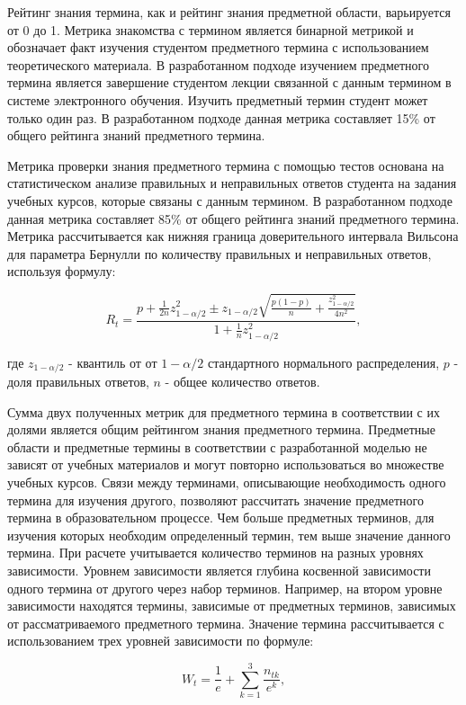 Рейтинг знания термина, как и рейтинг знания предметной области, варьируется от 0 до 1. Метрика знакомства с термином является бинарной метрикой и обозначает факт изучения студентом предметного термина с использованием теоретического материала. В разработанном подходе изучением предметного термина является завершение студентом лекции связанной с данным термином в системе электронного обучения. Изучить предметный термин студент может только один раз. В разработанном подходе данная метрика составляет 15\% от общего рейтинга знаний предметного термина.

Метрика проверки знания предметного термина с помощью тестов основана на статистическом анализе правильных и неправильных ответов студента на задания учебных курсов, которые связаны с данным термином. В разработанном подходе данная метрика составляет 85\% от общего рейтинга знаний предметного термина. Метрика рассчитывается как нижняя граница доверительного интервала Вильсона для параметра Бернулли по количеству правильных и неправильных ответов, используя формулу:

$$
    R_t = \frac{p+\frac{1}{2n}z_{1-\alpha/2}^2 \pm z_{1-\alpha/2}\sqrt{\frac{p(1-p)}{n}+\frac{z_{1-\alpha/2}^2}{4n^2}}{} }{1+\frac{1}{n}z_{1-\alpha/2}^2},
$$

где \(z_{1-\alpha/2}\) - квантиль от от \(1-\alpha/2\) стандартного нормального распределения, \(p\) - доля правильных ответов, \(n\) - общее количество ответов. 

Сумма двух полученных метрик для предметного термина в соответствии с их долями является общим рейтингом знания предметного термина. Предметные области и предметные термины в соответствии с разработанной моделью не зависят от учебных материалов и могут повторно использоваться во множестве учебных курсов. Связи между терминами, описывающие необходимость одного термина для изучения другого, позволяют рассчитать значение предметного термина в образовательном процессе. Чем больше предметных терминов, для изучения которых необходим определенный термин, тем выше значение данного термина. При расчете учитывается количество терминов на разных уровнях зависимости. Уровнем зависимости является глубина косвенной зависимости одного термина от другого через набор терминов. Например, на втором уровне зависимости находятся термины, зависимые от предметных терминов, зависимых от рассматриваемого предметного термина. Значение термина рассчитывается с использованием трех уровней зависимости по формуле: 

$$
    W_t = \frac{1}{e}+\sum_{k=1}^{3}\frac{n_{tk}}{e^k}, 
$$

